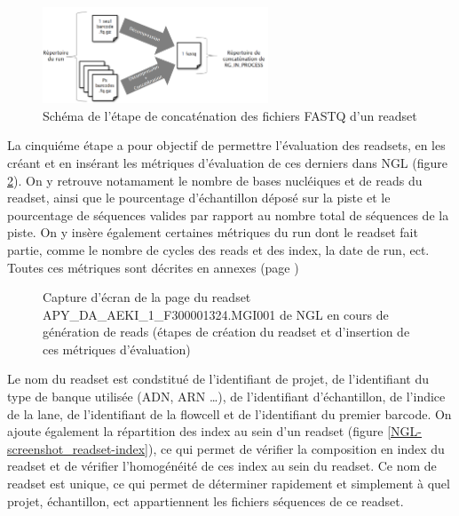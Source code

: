 \begin{figure}[H]
    \centering
    \includegraphics[width=0.6\textwidth]{img/Schéma_concaténation.png}
    \caption{\footnotesize{Schéma de l'étape de \og concaténation\fg{} des fichiers FASTQ d'un readset}}
    \label{schema-concat-fastq}
\end{figure}

La cinquiéme étape a pour objectif de permettre l'évaluation des readsets, en les créant et en insérant les métriques d'évaluation de ces derniers dans NGL (figure \ref{NGL-screenshot_readset}).
On y retrouve notamament le nombre de bases nucléiques et de reads du readset, ainsi que le pourcentage d'échantillon déposé sur la piste et le pourcentage de séquences valides par rapport au nombre total de séquences de la piste.
On y insère également certaines métriques du run dont le readset fait partie, comme le nombre de cycles des reads et des index, la date de run, ect. Toutes ces métriques sont décrites en annexes (page \pageref{anexes3})

\begin{figure}[H]
    \centering
    \caption{\footnotesize{Capture d'écran de la page du readset APY\_DA\_AEKI\_1\_F300001324.MGI001 de NGL en cours de génération de reads (étapes de création du readset et d'insertion de ces métriques d'évaluation)}}
    \label{NGL-screenshot_readset}
\end{figure}

Le nom du readset est condstitué de l'identifiant de projet, de l'identifiant du type de banque utilisée (ADN, ARN \dots), de l'identifiant d'échantillon, de l'indice de la lane, de l'identifiant de la flowcell et de l'identifiant du premier barcode.
On ajoute également la répartition des index au sein d'un readset (figure \ref{NGL-screenshot_readset-index}), ce qui permet de vérifier la composition en index du readset et de vérifier l'homogénéité de ces index au sein du readset.
Ce nom de readset est unique, ce qui permet de déterminer rapidement et simplement à quel projet, échantillon, ect appartiennent les fichiers séquences de ce readset.

